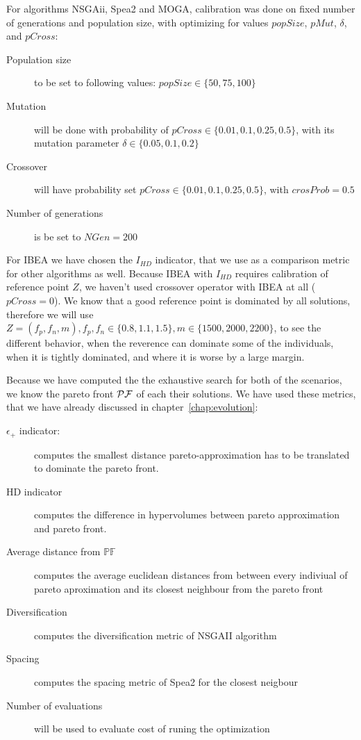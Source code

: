 \documentclass[12pt,oneside]{fithesis2}
\begin{document}
For algorithms NSGAii, Spea2 and MOGA, calibration was done on fixed number of generations and population size, with optimizing for values $popSize$, $pMut$, $\delta$, and $pCross$:

\begin{description}
  \item[Population size] to be set to following values: $popSize \in \{50,75,100\}$
\item[Mutation] will be done with probability of $pCross \in \{0.01,0.1,0.25,0.5\}$, with its mutation parameter $\delta \in \{0.05,0.1,0.2\}$
\item[Crossover] will have probability set $pCross \in \{0.01,0.1,0.25,0.5\}$, with $crosProb = 0.5$
\item[Number of generations] is be set to $NGen=200$ 
\end{description}

For IBEA we have chosen the $I_{HD}$ indicator, that we use as a comparison metric for other algorithms as well. Because IBEA with $I_{HD}$ requires calibration of reference point $Z$, we haven't used crossover operator with IBEA at all ($pCross=0$). We know that a good reference point is dominated by all solutions, therefore we will use $Z = (f_p,f_n,m), f_p,f_n \in \{0.8,1.1,1.5\}, m \in \{1500,2000,2200\}$, to see the different behavior, when the reverence can dominate some of the individuals, when it is tightly dominated, and where it is worse by a large margin.

Because we have computed the the exhaustive search for both of the scenarios, we know the pareto front $\cal{PF}$ of each their solutions. We have used these metrics, that we have already discussed in chapter~\ref{chap:evolution}:

\begin{description}
  \item[$\epsilon_+$ indicator:] computes the smallest distance pareto-approximation has to be translated to dominate the pareto front.
  \item[HD indicator] computes the difference in hypervolumes between pareto approximation and pareto front.
  \item[Average distance from $\mathbb{PF}$] computes the average euclidean distances from between every indiviual of pareto aproximation and its closest neighbour from the pareto front
  \item[Diversification] computes the diversification metric of NSGAII algorithm
  \item[Spacing] computes the spacing metric of Spea2 for the closest neigbour
  \item[Number of evaluations] will be used to evaluate cost of runing the optimization
\end{description}
 
\end{document}
